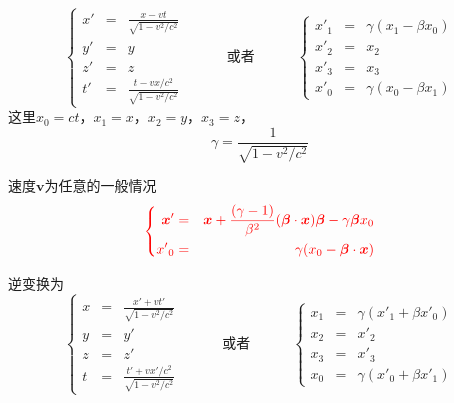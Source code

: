 \documentclass[12pt,a4paper]{article}
\renewcommand{\vec}[1]{\boldsymbol{#1}}
\begin{document}
\begin{equation}
\left\{
\begin{aligned}
x' &=& \frac{x -vt}{\sqrt{1-v^2/c^2} } \\
y' &=& y \\
z' &=& z \\
t' &=& \frac{t -vx/c^2 }{\sqrt{1-v^2/c^2} }
\end{aligned} \right.
\hspace{3em} \text{或者} \hspace{3em} 
\left\{
\begin{aligned}
{x'}_1 &=& \gamma(x_1 -\beta x_0) \\
{x'}_2 &=& x_2 \\
{x'}_3 &=& x_3 \\
{x'}_0 &=&\gamma(x_0 -\beta x_1)
\end{aligned} \right.
\end{equation}
这里$x_0 = ct$，$x_1 = x$，$x_2 = y$，$x_3 = z$，
\begin{equation}
\gamma = \frac{1}{\sqrt{1-v^2/c^2} }
\end{equation}

速度$\vec{v}$为任意的一般情况
\begin{equation}
\color{red} \left\{
\begin{aligned}
\vec{x}' &=& \vec{x} +\frac{(\gamma -1)}{\beta^2} (\vec{\beta}\cdot \vec{x})\vec{\beta} -\gamma\vec{\beta}x_0 \\
{x'}_0 &=& \gamma(x_0 -\vec{\beta}\cdot \vec{x})
\end{aligned}
\right.
\end{equation}

逆变换为
\begin{equation}
\left\{
\begin{aligned}
x &=& \frac{x' +vt'}{\sqrt{1-v^2/c^2} } \\
y &=& y' \\
z &=& z'\\
t &=& \frac{t' +vx'/c^2 }{\sqrt{1-v^2/c^2} }
\end{aligned} \right.
\hspace{3em} \text{或者} \hspace{3em} 
\left\{
\begin{aligned}
{x}_1 &=& \gamma({x'}_1 +\beta {x'}_0) \\
{x}_2 &=& {x'}_2 \\
{x}_3 &=& {x'}_3 \\
{x}_0 &=&\gamma({x'}_0 +\beta {x'}_1)
\end{aligned} \right.
\end{equation}
\end{document}
